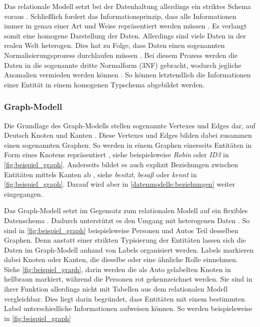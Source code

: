 Das relationale Modell setzt bei der Datenhaltung allerdings ein striktes Schema voraus \cite{rdbms_book}. Schließlich fordert das Informationsprinzip, dass alle Informationen immer in genau einer Art und Weise repräsentiert werden müssen \cite{rdbms_history}. Es verlangt somit eine homogene Darstellung der Daten. Allerdings sind viele Daten in der realen Welt heterogen. Dies hat zu Folge, dass Daten einen sogenannten Normalisierungsprozess durchlaufen müssen \cite{rdbms_book}. Bei diesem Prozess werden die Daten in die sogenannte dritte Normalform (3NF) gebracht, wodurch jegliche Anomalien vermieden werden können \cite{rdbms_book}. So können letztendlich die Informationen einer Entität in einem homogenen Typschema abgebildet werden. 

\subsubsection{Graph-Modell}
Die Grundlage des Graph-Modells stellen sogenannte Vertexes und Edges dar, auf Deutsch Knoten und Kanten \cite{gdbms}. Diese Vertexes und Edges bilden dabei zusammen einen sogenannten Graphen. So werden in einem Graphen einerseits Entitäten in Form eines Knotens repräsentiert \cite{gdbms}, siehe beispielsweise \textit{Robin} oder \textit{ID3} in \autoref{fig:beispiel_graph}. Anderseits bildet es auch explizit Beziehungen zwischen Entitäten mittels Kanten ab \cite{gdbms}, siehe \textit{besitzt}, \textit{besaß} oder \textit{kennt} in \autoref{fig:beispiel_graph}. Darauf wird aber in \autoref{datenmodelle:beziehungen} weiter eingegangen.

Das Graph-Modell setzt im Gegensatz zum relationalen Modell auf ein flexibles Datenschema \cite{gdbms}. Dadurch unterstützt es den Umgang mit heterogenen Daten \cite{gdbms}. So sind in \autoref{fig:beispiel_graph} beispielsweise Personen und Autos Teil desselben Graphen. Denn anstatt einer strikten Typisierung der Entitäten lassen sich die Daten im Graph-Modell anhand von Labels organisiert werden. Labels markieren dabei Knoten oder Kanten, die dieselbe oder eine ähnliche Rolle einnehmen. Siehe \autoref{fig:beispiel_graph}, darin werden die als Auto gelabelten Knoten in hellbraun markiert, während die Personen rot gekennzeichnet werden. Sie sind in ihrer Funktion allerdings nicht mit Tabellen aus dem relationalen Modell vergleichbar. Dies liegt darin begründet, dass Entitäten mit einem bestimmten Label unterschiedliche Informationen aufweisen können. So werden beispielsweise in \autoref{fig:beispiel_graph} 

